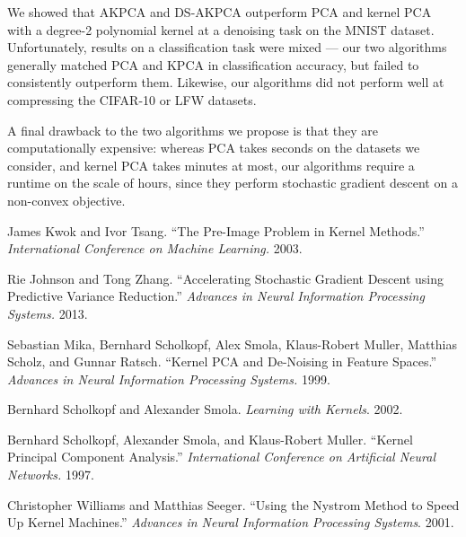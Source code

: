 \documentclass[]{article}
\begin{document}
We showed that AKPCA and DS-AKPCA outperform PCA and kernel PCA with a degree-2 polynomial kernel at a denoising task on the MNIST dataset.
Unfortunately, results on a classification task were mixed --- our two algorithms generally matched PCA and KPCA in classification accuracy, but failed to consistently outperform them.
Likewise, our algorithms did not perform well at compressing the CIFAR-10 or LFW datasets.

A final drawback to the two algorithms we propose is that they are computationally expensive: whereas PCA takes seconds on the datasets we consider, and kernel PCA takes minutes at most, our algorithms require a runtime on the scale of hours, since they perform stochastic gradient descent on a non-convex objective.

\begin{thebibliography}{9}

James Kwok and Ivor Tsang.
``The Pre-Image Problem in Kernel Methods.''
\textit{International Conference on Machine Learning.}
2003.

Rie Johnson and Tong Zhang.
``Accelerating Stochastic Gradient Descent using Predictive Variance Reduction.''
\textit{Advances in Neural Information Processing Systems.}
2013.

Sebastian Mika, Bernhard Scholkopf, Alex Smola, Klaus-Robert Muller, Matthias Scholz, and Gunnar Ratsch.
``Kernel PCA and De-Noising in Feature Spaces.''
\textit{Advances in Neural Information Processing Systems.}
1999.

Bernhard Scholkopf and  Alexander Smola.
\textit{Learning with Kernels}.
2002.

Bernhard Scholkopf, Alexander Smola, and Klaus-Robert Muller.
``Kernel Principal Component Analysis.''
\textit{International Conference on Artificial Neural Networks.}
1997.

Christopher Williams and Matthias Seeger.
``Using the Nystrom Method to Speed Up Kernel Machines.''
\textit{Advances in Neural Information Processing Systems}.
2001.

\end{thebibliography}
\end{document}
